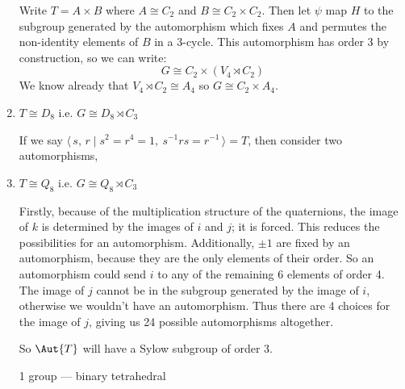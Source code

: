 \begin{enumerate}
        Write \(T = A \times B\) where \(A \cong C_2\) and \(B \cong C_2 \times C_2\).
        Then let \(\psi\) map \(H\) to the subgroup generated by the automorphism which fixes \(A\) and permutes the
        non-identity elements of \(B\) in a 3-cycle.
        This automorphism has order 3 by construction, so we can write:
        \[G \cong C_2 \times (V_4 \rtimes C_2)\]
        We know already that \(V_4 \rtimes C_2 \cong A_4\) so \(G \cong C_2 \times A_4\).

    \item \(T \cong D_8\) i.e. \(G \cong D_8 \rtimes C_3\)

        If we say \(\langle\,s,\,r \mid s^2 = r^4 = 1,\ s^{-1}rs = r^{-1}\,\rangle = T\), then consider two
        automorphisms, 

    \item \(T \cong Q_8\) i.e. \(G \cong Q_8 \rtimes C_3\)

        Firstly, because of the multiplication structure of the quaternions, the image of \(k\) is determined by the
        images of \(i\) and \(j\); it is forced.
        This reduces the possibilities for an automorphism.
        Additionally, \(\pm 1\) are fixed by an automorphism, because they are the only elements of their order.
        So an automorphism could send \(i\) to any of the remaining 6 elements of order 4.
        The image of \(j\) cannot be in the subgroup generated by the image of \(i\), otherwise we wouldn't have an
        automorphism.
        Thus there are 4 choices for the image of \(j\), giving us 24 possible automorphisms altogether.

        So \(\Aut{T}\) will have a Sylow subgroup of order 3.

        1 group --- binary tetrahedral
\end{enumerate}


